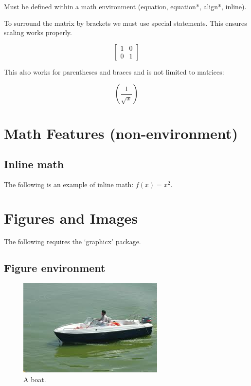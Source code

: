 \documentclass{article}
\begin{document}
Must be defined within a math environment (equation, equation*, align*, inline).

To surround the matrix by brackets we must use special statements. This ensures scaling works properly.

\begin{equation*}
	\left[
	\begin{matrix}
		1 & 0\\
		0 & 1
	\end{matrix}
	\right]
\end{equation*}

This also works for parentheses and braces and is not limited to matrices:

\begin{equation*}
	\left(\frac{1}{\sqrt{x}}\right)
\end{equation*}

\section{Math Features (non-environment)}

\subsection{Inline math}
The following is an example of inline math: $f(x) = x^2$.

\section{Figures and Images}

The following requires the `graphicx' package.

\subsection{Figure environment}

\begin{figure}[H]
	\includegraphics[width=\linewidth]{boat.jpg}
	\caption{A boat.}
	\label{fig:boat1}
\end{figure}
\end{document}
